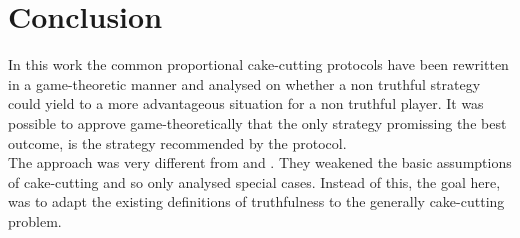 % 
\section{Conclusion}
In this work the common proportional cake-cutting protocols have been rewritten in a game-theoretic manner and analysed on whether a non truthful strategy could yield to a more advantageous situation for a non truthful player. It was possible to approve game-theoretically that the only strategy promissing the best outcome, is the strategy recommended by the protocol.\\
The approach was very different from \cite{chen:truth} and \cite{tamuz}. They weakened the basic assumptions of cake-cutting and so only analysed special cases. Instead of this, the goal here, was to adapt the existing definitions of truthfulness to the generally cake-cutting problem.\\
\pagebreak
